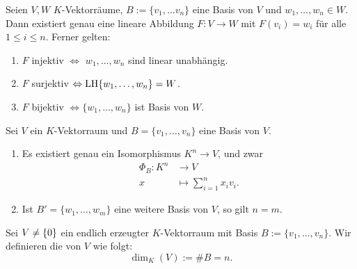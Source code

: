 \setcounter{definition}{14}
\begin{satz}
	\label{satz:I.8.15}
	Seien $V,W$ $K$-Vektorräume, $B := \{v_1,\dots v_n\}$ eine Basis von $V$ und $w_1,\dots,w_n \in W$.
	Dann existiert genau eine lineare Abbildung $F \colon V \rightarrow W$ mit $F(v_i) = w_i$ für alle $1 \leq i \leq n$.
	Ferner gelten:
	\begin{enumerate}[(1)]
		\item $F$ injektiv $\Leftrightarrow$ $w_1,\dots, w_n$ sind linear unabhängig.
		\item $F$ surjektiv $\Leftrightarrow \operatorname{LH}\{w_1,\dots,w_n\} = W$.
		\item $F$ bijektiv $\Leftrightarrow \{w_1,\dots,w_n\}$ ist Basis von $W$.
	\end{enumerate}
\end{satz}

\begin{korollar}
	\label{kor:I.8.16}
	Sei $V$ ein $K$-Vektorraum und $B = \{v_1,\dots,v_n\}$ eine Basis von $V$.
	\begin{enumerate}[(1)]
		\item	Es existiert genau ein Isomorphismus $K^n \rightarrow V$, und zwar
		\begin{align*}
			\Phi_B \colon K^n &\longrightarrow V \\
			x &\longmapsto \sum_{i=1}^{n} x_iv_i.
		\end{align*}
		\item Ist $B' = \{w_1,\dots,w_m\}$ eine weitere Basis von $V$, so gilt $n = m$.
	\end{enumerate}
\end{korollar}

\begin{definition}[Dimension]
	\label{def:I.8.17}
	Sei $V \neq \{0\}$ ein endlich erzeugter $K$-Vektorraum mit Basis $B := \{v_1,\dots,v_n\}$. 
	Wir definieren die  von $V$ wie folgt:
	\[
		\dim_K(V) := \#B = n.
	\]
\end{definition}